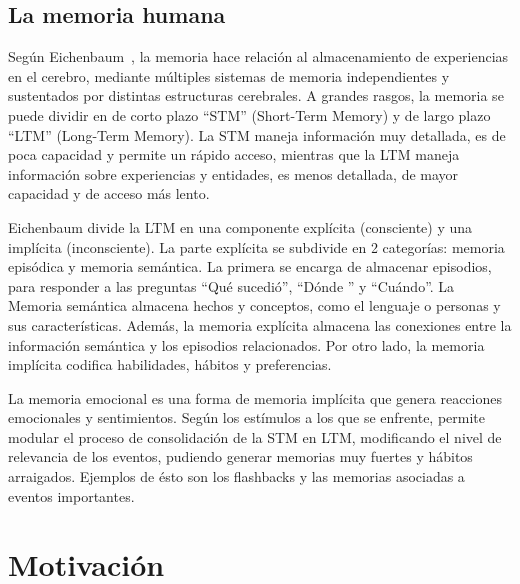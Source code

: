 \subsection{La memoria humana}

Según Eichenbaum~\cite{Eichenbaum:2008}, la memoria hace relación al almacenamiento de experiencias en el cerebro, mediante múltiples sistemas de memoria independientes y sustentados por distintas estructuras cerebrales. A grandes rasgos, la memoria se puede dividir en de corto plazo ``STM'' (Short-Term Memory) y de largo plazo ``LTM'' (Long-Term Memory). La STM maneja información muy detallada, es de poca capacidad y permite un rápido acceso, mientras que la LTM maneja información sobre experiencias y entidades, es menos detallada, de mayor capacidad y de acceso más lento.

Eichenbaum divide la LTM en una componente explícita (consciente) y una implícita (inconsciente). La parte explícita se subdivide en 2 categorías: memoria episódica y memoria semántica. La primera se encarga de almacenar episodios, para responder a las preguntas ``Qué sucedió'', ``Dónde '' y ``Cuándo''. La Memoria semántica almacena hechos y conceptos, como el lenguaje o personas y sus características. Además, la memoria explícita  almacena las conexiones entre la información semántica y los episodios relacionados. Por otro lado, la memoria implícita codifica habilidades, hábitos y preferencias.

La memoria emocional es una forma de memoria implícita que genera reacciones emocionales y sentimientos. Según los estímulos a los que se enfrente, permite modular el proceso de consolidación de la STM en LTM, modificando el nivel de relevancia de los eventos, pudiendo generar memorias muy fuertes y hábitos arraigados. Ejemplos de ésto son los flashbacks y las memorias asociadas a eventos importantes.




\section{Motivación}

